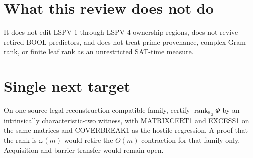 \documentclass[11pt]{article}
\begin{document}
\section*{What this review does not do}
It does not edit LSPV-1 through LSPV-4 ownership regions, does not revive retired
BOOL predictors, and does not treat prime provenance, complex Gram rank, or
finite leaf rank as an unrestricted SAT-time measure.

\section*{Single next target}
On one source-legal reconstruction-compatible family, certify
\(\operatorname{rank}_{\mathbb F_2}\Phi\) by an intrinsically characteristic-two
witness, with MATRIXCERT1 and EXCESS1 on the same matrices and COVERBREAK1 as the
hostile regression. A proof that the rank is \(\omega(m)\) would retire the
\(O(m)\) contraction for that family only. Acquisition and barrier transfer would
remain open.

\end{document}

